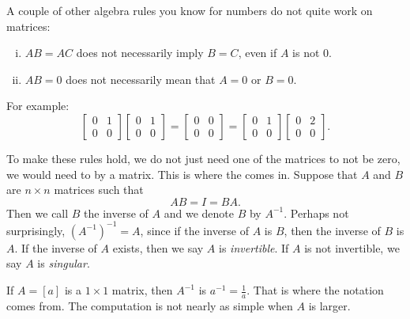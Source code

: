 A couple of other algebra rules you know for numbers do not quite
work on matrices:
\begin{enumerate}[(i)]
\item $AB = AC$ does not necessarily imply $B=C$, even if $A$ is not 0.
\item $AB = 0$ does not necessarily mean that $A=0$ or $B=0$.
\end{enumerate}
For example:
\begin{equation*}
\begin{bmatrix} 0 & 1 \\ 0 & 0 \end{bmatrix}
\begin{bmatrix} 0 & 1 \\ 0 & 0 \end{bmatrix}
=
\begin{bmatrix} 0 & 0 \\ 0 & 0 \end{bmatrix}
=
\begin{bmatrix} 0 & 1 \\ 0 & 0 \end{bmatrix}
\begin{bmatrix} 0 & 2 \\ 0 & 0 \end{bmatrix} .
\end{equation*}

To make these rules hold, we do not just need one of the matrices to not be zero,
we would need to  by
a matrix.  This is where the \emph{} comes in.
Suppose that $A$ and $B$ are $n \times n$ matrices such that
\begin{equation*}
AB = I = BA .
\end{equation*}
Then we call $B$ the inverse of $A$ and we denote $B$ by $A^{-1}$.
Perhaps not surprisingly, ${(A^{-1})}^{-1} = A$, since if the inverse of $A$
is $B$, then the inverse of $B$ is $A$.
If the inverse of $A$ exists, then we say $A$ is
\emph{invertible}.
If $A$ is not invertible, we say $A$ is
\emph{singular}.

If $A = [a]$ is a $1 \times 1$ matrix, then $A^{-1}$ is $a^{-1} =
\frac{1}{a}$.  That is where the notation comes from.  The computation is not nearly as simple when $A$ is
larger.

